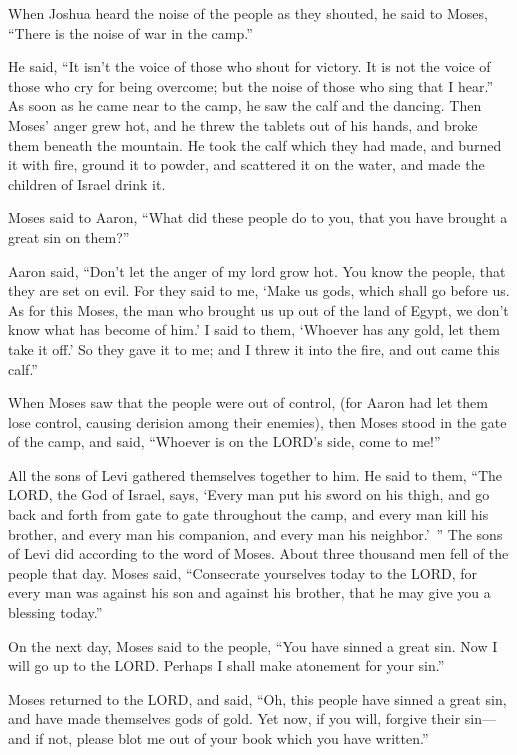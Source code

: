 \myverse{}When Joshua heard the noise of the people as they shouted, he
said to Moses, “There is the noise of war in the camp.”


\myverse{}He said, “It isn’t the voice of those who shout for victory.
It is not the voice of those who cry for being overcome; but the noise of those who sing that I hear.”
\myverse{}As soon as he came near to the camp, he saw the calf and the dancing. Then
Moses’ anger grew hot, and he threw the tablets out of his hands, and broke them beneath the mountain.
\myverse{}He took the calf which they had made, and burned it with fire, ground it
to powder, and scattered it on the water, and made the children of Israel drink it.


\myverse{}Moses said to Aaron, “What did these people do to you, that
you have brought a great sin on them?”


\myverse{}Aaron said, “Don’t let the anger of my lord grow hot. You know
the people, that they are set on evil.
\myverse{}For they said to me, ‘Make us gods, which shall go before us. As for this
Moses, the man who brought us up out of the land of Egypt, we don’t know what has become of him.’
\myverse{}I said to them, ‘Whoever has any gold, let them take it off.’ So they gave
it to me; and I threw it into the fire, and out came this calf.”


\myverse{}When Moses saw that the people were out of control, (for Aaron
had let them lose control, causing derision among their enemies),
\myverse{}then Moses stood in the gate of the camp, and said, “Whoever is on the LORD’s
side, come to me!”

All the sons of Levi gathered themselves together to him.
\myverse{}He said to them, “The LORD, the God of Israel, says, ‘Every man put his sword
on his thigh, and go back and forth from gate to gate throughout the camp, and every man kill his brother,
and every man his companion, and every man his neighbor.’ ”
\myverse{}The sons of Levi did according to the word of Moses. About three thousand
men fell of the people that day.
\myverse{}Moses said, “Consecrate yourselves today to the LORD, for every man was against
his son and against his brother, that he may give you a blessing today.”


\myverse{}On the next day, Moses said to the people, “You have sinned
a great sin. Now I will go up to the LORD. Perhaps I shall make atonement for your sin.”


\myverse{}Moses returned to the LORD, and said, “Oh, this people have
sinned a great sin, and have made themselves gods of gold.
\myverse{}Yet now, if you will, forgive their sin—and if not, please blot me out of
your book which you have written.”


